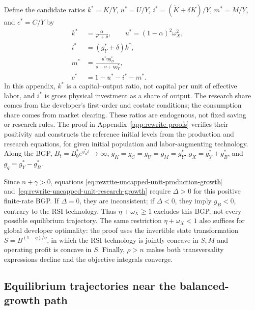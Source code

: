 Define the candidate ratios $k^*=K/Y$, $u^*=U/Y$,
$i^*=(\dot K+\delta K)/Y$, $m^*=M/Y$, and $c^*=C/Y$ by
\begin{align}
 k^*&=\frac{\alpha}{r^*+\delta},\qquad u^*=(1-\alpha)^2\omega_X^2,
 \label{eq:rewrite-uncapped-unit-capital-inference}\\
 i^*&=(g_Y^*+\delta)k^*,
 \label{eq:rewrite-uncapped-unit-investment}\\
 m^*&=\frac{u^*\eta g_B^*}{\rho-n+\eta g_Y^*},
 \label{eq:rewrite-uncapped-unit-research-share}\\
 c^*&=1-u^*-i^*-m^*.
 \label{eq:rewrite-uncapped-unit-consumption}
\end{align}
In this appendix, $k^*$ is a capital--output ratio, not capital per unit of
effective labor, and $i^*$ is gross physical investment as a share of output.
The research share comes from the developer's first-order
and costate conditions; the consumption share comes from market clearing.
These ratios are endogenous, not fixed saving or research rules.
The proof in Appendix~\ref{app:rewrite-proofs} verifies their positivity
and constructs the reference initial levels from the production and
research equations, for given initial population and labor-augmenting technology.
Along the BGP, $B_t=B_0^*e^{g_B^*t}\to\infty$,
$g_K=g_C=g_U=g_M=g_Y^*$, $g_X=g_Y^*+g_B^*$, and $g_q=g_Y^*-g_B^*$.

Since $n+\gamma>0$, equations
\eqref{eq:rewrite-uncapped-unit-production-growth}
and~\eqref{eq:rewrite-uncapped-unit-research-growth} require $\Delta>0$ for
this positive finite-rate BGP. If $\Delta=0$, they are inconsistent; if
$\Delta<0$, they imply $g_B<0$, contrary to the RSI technology. Thus
$\eta+\omega_X\geq1$ excludes this BGP, not every possible equilibrium
trajectory. The same restriction $\eta+\omega_X<1$ also suffices for
global developer optimality: the proof uses the invertible state transformation
$S=B^{(1-\eta)/\eta}$, in which the RSI technology is jointly concave in
$S,M$ and operating profit is concave in $S$. Finally, $\rho>n$ makes
both transversality expressions decline and the objective integrals converge.

\subsection{Equilibrium trajectories near the balanced-growth path}

